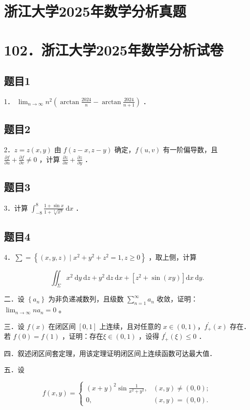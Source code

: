 \documentclass{article}
\begin{document}
\section*{浙江大学2025年数学分析真题}
\section*{102．浙江大学2025年数学分析试卷}

\subsection{题目1}
1． \(\lim _{n \rightarrow \infty} n^{2}\left(\arctan \frac{2024}{n}-\arctan \frac{2024}{n+1}\right)\) ．

\subsection{题目2}
2．\(z=z(x, y)\) 由 \(f(z-x, z-y)\) 确定，\(f(u, v)\) 有一阶偏导数，且 \(\frac{\partial f}{\partial u}+\frac{\partial f}{\partial v} \neq 0\) ，计算 \(\frac{\partial z}{\partial x}+\frac{\partial z}{\partial y}\) ．

\subsection{题目3}
3．计算 \(\int_{-8}^{8} \frac{1+\sin x}{1+\sqrt[3]{x^{2}}} \mathrm{~d} x\) ．

\subsection{题目4}
4．\(\sum=\left\{(x, y, z) \mid x^{2}+y^{2}+z^{2}=1, z \geq 0\right\}\) ，取上侧，计算

\[
\iint_{\Sigma} x^{2} \mathrm{~d} y \mathrm{~d} z+y^{2} \mathrm{~d} z \mathrm{~d} x+\left[z^{2}+\sin (x y)\right] \mathrm{d} x \mathrm{~d} y .
\]

二．设 \(\left\{a_{n}\right\}\) 为非负递减数列，且级数 \(\sum_{n=1}^{\infty} a_{n}\) 收敛，证明： \(\lim _{n \rightarrow \infty} n a_{n}=0\) 。

三．设 \(f(x)\) 在闭区间 \([0,1]\) 上连续，且对任意的 \(x\in(0,1)\)，\(f_{+}^{\prime}(x)\) 存在．若 \(f(0)=f(1)\) ，证明：存在\(\xi \in(0,1)\) ，设得 \(f_{+}^{\prime}(\xi) \leq 0\) ．

四．叙述闭区间套定理，用该定理证明闭区间上连续函数可达最大值．

五．设

\[
f(x, y)= \begin{cases}(x+y)^{2} \sin \frac{1}{x^{2}+y^{2}}, & (x, y) \neq(0,0) ; \\ 0, & (x, y)=(0,0) .\end{cases}
\]
\end{document}

